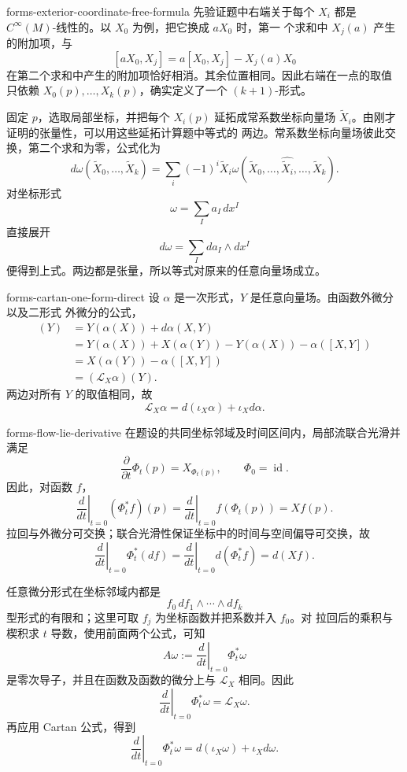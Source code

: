 \begin{solution}{forms-exterior-coordinate-free-formula}
先验证题中右端关于每个 \(X_i\) 都是
\(C^\infty(M)\)-线性的。以 \(X_0\) 为例，把它换成 \(aX_0\) 时，第一
个求和中 \(X_j(a)\) 产生的附加项，与
\[
 [aX_0,X_j]=a[X_0,X_j]-X_j(a)X_0
\]
在第二个求和中产生的附加项恰好相消。其余位置相同。因此右端在一点的取值
只依赖 \(X_0(p),\ldots,X_k(p)\)，确实定义了一个 \((k+1)\)-形式。

固定 \(p\)，选取局部坐标，并把每个 \(X_i(p)\) 延拓成常系数坐标向量场
\(\widetilde X_i\)。由刚才证明的张量性，可以用这些延拓计算题中等式的
两边。常系数坐标向量场彼此交换，第二个求和为零，公式化为
\[
 d\omega(\widetilde X_0,\ldots,\widetilde X_k)
 =\sum_i(-1)^i\widetilde X_i
   \omega(\widetilde X_0,\ldots,\widehat{\widetilde X_i},
          \ldots,\widetilde X_k).
\]
对坐标形式
\[
 \omega=\sum_I a_I\,dx^I
\]
直接展开
\[
 d\omega=\sum_I da_I\wedge dx^I
\]
便得到上式。两边都是张量，所以等式对原来的任意向量场成立。
\end{solution}

\begin{solution}{forms-cartan-one-form-direct}
设 \(\alpha\) 是一次形式，\(Y\) 是任意向量场。由函数外微分以及二形式
外微分的公式，
\begin{align*}
 [d(\iota_X\alpha)+\iota_Xd\alpha](Y)
 &=Y(\alpha(X))+d\alpha(X,Y)\\
 &=Y(\alpha(X))
   +X(\alpha(Y))-Y(\alpha(X))-\alpha([X,Y])\\
 &=X(\alpha(Y))-\alpha([X,Y])\\
 &=(\mathcal L_X\alpha)(Y).
\end{align*}
两边对所有 \(Y\) 的取值相同，故
\[
 \mathcal L_X\alpha=d(\iota_X\alpha)+\iota_Xd\alpha.
\]
\end{solution}

\begin{solution}{forms-flow-lie-derivative}
在题设的共同坐标邻域及时间区间内，局部流联合光滑并满足
\[
 \frac{\partial}{\partial t}\Phi_t(p)=X_{\Phi_t(p)},
 \qquad \Phi_0=\operatorname{id}.
\]
因此，对函数 \(f\)，
\[
 \left.\frac{d}{dt}\right|_{t=0}(\Phi_t^*f)(p)
 =\left.\frac{d}{dt}\right|_{t=0}f(\Phi_t(p))
 =Xf(p).
\]
拉回与外微分可交换；联合光滑性保证坐标中的时间与空间偏导可交换，故
\[
 \left.\frac{d}{dt}\right|_{t=0}\Phi_t^*(df)
 =\left.\frac{d}{dt}\right|_{t=0}d(\Phi_t^*f)
 =d(Xf).
\]

任意微分形式在坐标邻域内都是
\[
 f_0\,df_1\wedge\cdots\wedge df_k
\]
型形式的有限和；这里可取 \(f_j\) 为坐标函数并把系数并入 \(f_0\)。对
拉回后的乘积与楔积求 \(t\) 导数，使用前面两个公式，可知
\[
 A\omega:=\left.\frac{d}{dt}\right|_{t=0}\Phi_t^*\omega
\]
是零次导子，并且在函数及函数的微分上与 \(\mathcal L_X\) 相同。因此
\[
 \left.\frac{d}{dt}\right|_{t=0}\Phi_t^*\omega
 =\mathcal L_X\omega.
\]
再应用 Cartan 公式，得到
\[
 \left.\frac{d}{dt}\right|_{t=0}\Phi_t^*\omega
 =d(\iota_X\omega)+\iota_Xd\omega.
\]
\end{solution}
